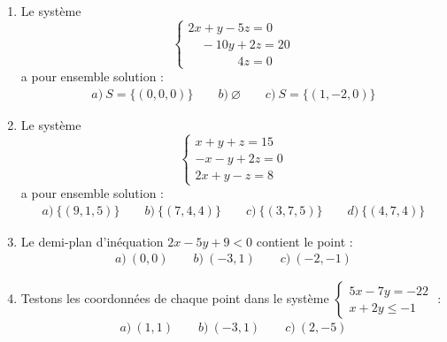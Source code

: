\documentclass[12pt,a4paper]{article}
\begin{document}
\begin{enumerate}
  \item Le système 
  \[
  \begin{cases}
  2x + y - 5z = 0 \\
  \quad -10y + 2z = 20 \\
  \quad\quad\qquad 4z = 0
  \end{cases}
  \]
  a pour ensemble solution :
  \begin{align*}
  a)~S = \{(0,0,0)\} \qquad 
  b)~\varnothing \qquad 
  c)~S = \{(1,-2,0)\}
  \end{align*}

  \item Le système 
  \[
  \begin{cases}
  x + y + z = 15 \\
  -x - y + 2z = 0 \\
  2x + y - z = 8
  \end{cases}
  \]
  a pour ensemble solution :
  \begin{align*}
  a)~\{(9,1,5)\} \qquad 
  b)~\{(7,4,4)\} \qquad 
  c)~\{(3,7,5)\} \qquad 
  d)~\{(4,7,4)\}
  \end{align*}

  \item Le demi-plan d’inéquation \(2x - 5y + 9 < 0\) contient le point :
  \begin{align*}
  a)~(0,0) \qquad 
  b)~(-3,1) \qquad 
  c)~(-2,-1)
  \end{align*}

\item Testons les coordonnées de chaque point dans le système $\begin{cases} 5x - 7y = -22 \\ x + 2y \le -1 \end{cases}$ :
\begin{align*}
  a)~(1,1) \qquad 
  b)~(-3,1) \qquad 
  c)~(2,-5)
  \end{align*}
\end{enumerate}
\end{document}
